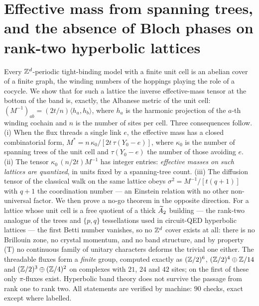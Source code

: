\renewcommand{\Yt}{\widetilde Y_{\bm\alpha}}
\chapter[Effective mass from spanning trees, and the absence of Bloch phases on rank-two hyperbolic lattices]{Effective mass from spanning trees, and the absence of Bloch phases on rank-two hyperbolic lattices}\label{chap:Phys1}
\begin{chapterabstract}
Every $\mathbb{Z}^{d}$-periodic tight-binding model with a finite unit cell is an abelian cover of a
finite graph, the winding numbers of the hoppings playing the role of a cocycle. We show
that for such a lattice the inverse effective-mass tensor at the bottom of the band is,
exactly, the Albanese metric of the unit cell: $(M^{-1})_{ab}=(2t/n)\langle
h_a,h_b\rangle$, where $h_a$ is the harmonic projection of the $a$-th winding cochain and
$n$ is the number of sites per cell. Three consequences follow. (i) When the flux threads a
single link $e$, the effective mass has a closed combinatorial form,
$M^{*}=n\,\kappa_0/[2t\,\tau(Y_0\!-\!e)]$, where $\kappa_0$ is the number of spanning trees
of the unit cell and $\tau(Y_0\!-\!e)$ the number of those avoiding $e$. (ii) The tensor
$\kappa_0\,(n/2t)M^{-1}$ has integer entries: \emph{effective masses on such lattices are
quantized}, in units fixed by a spanning-tree count. (iii) The diffusion tensor of the
classical walk on the same lattice obeys $\sigma^{2}=M^{-1}/[t(q{+}1)]$ with $q+1$ the
coordination number --- an Einstein relation with no other non-universal factor. We then
prove a no-go theorem in the opposite direction. For a lattice whose unit cell is a free
quotient of a thick $\widetilde A_2$ building --- the rank-two analogue of the trees and $\{p,q\}$
tessellations used in circuit-QED hyperbolic lattices --- the first Betti number vanishes,
so no $\mathbb{Z}^{d}$ cover exists at all: there is no Brillouin zone, no crystal momentum, and no
band structure, and by property (T) no continuous family of unitary characters deforms the
trivial one either. The threadable fluxes form a \emph{finite} group, computed exactly as
$(\mathbb{Z}/2)^{6}$, $(\mathbb{Z}/2)^{4}\oplus\mathbb{Z}/14$ and $(\mathbb{Z}/2)^{3}\oplus(\mathbb{Z}/4)^{2}$ on complexes with
$21$, $24$ and $42$ sites; on the first of these only $\pi$-fluxes exist. Hyperbolic band
theory does not survive the passage from rank one to rank two. All statements are verified
by machine: $90$ checks, exact except where labelled.
\end{chapterabstract}

